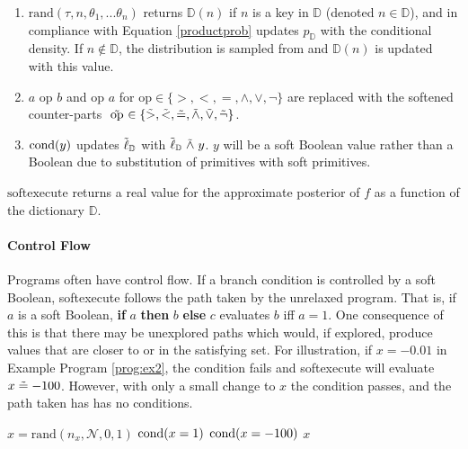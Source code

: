\begin{enumerate}
  \item $\textrm{rand}(\tau, n, \theta_1, ...\theta_n)$ returns $\mathbb{D}(n)$ if $n$ is a key in $\mathbb{D}$ (denoted $n \in \mathbb{D}$), and in compliance with Equation \ref{productprob} updates $p_\mathbb{D}$ with the conditional density. If $n \notin \mathbb{D}$, the distribution is sampled from and $\mathbb{D}(n)$ is updated with this value.  
  \item $a \text{ op } b$ and $\textrm{op } a$ for $\textrm{op} \in \{>, <, =, \land, \lor, \neg\}$ are replaced with the softened counter-parts $\mathrel{\tilde{\textrm{ op }}} \in \{\mathrel{\tilde{>}}, \mathrel{\tilde{<}}, \mathrel{\tilde{=}}, \mathrel{\tilde{\land}}, \mathrel{\tilde{\lor}}, \mathrel{\tilde{\neg}}\}$.
  \item $\operatorname{cond}(y)$ updates $\tilde{\operatorname{\ell}}_\mathbb{D}$ with $\tilde{\operatorname{\ell}}_\mathbb{D} \mathrel{\tilde{\land}} y$. $y$ will be a soft Boolean value rather than a Boolean due to substitution of primitives with soft primitives.
\end{enumerate}

$\textrm{softexecute}$ returns a real value for the approximate posterior of $f$ as a function of the dictionary $\mathbb{D}$.

\paragraph{Control Flow}
Programs often have control flow.
If a branch condition is controlled by a soft Boolean, softexecute follows the path taken by the unrelaxed program.  That is, if $a$ is a soft Boolean, \textbf{if} $a$ \textbf{then} $b$ \textbf{else} $c$ evaluates $b$ iff $a = 1$.
One consequence of this is that there may be unexplored paths which would, if explored, produce values that are closer to or in the satisfying set.
For illustration, if $x = -0.01$ in Example Program \ref{prog:ex2},
 the condition fails and \textrm{softexecute} will evaluate $x \mathrel{\tilde{=}} -100$. However, with only a small change to $x$ the condition passes, and the path taken has has no conditions.



\begin{exprogram}[tb]
\caption{}
\label{prog:ex2}
\begin{algorithmic}
\STATE $x = \textrm{rand}(n_x, \mathcal{N}, 0, 1)$
\STATE $\operatorname{cond}(x = 1)$
\ELSE
\STATE $\operatorname{cond}(x = -100)$
\ENDIF
{} $x$
\end{algorithmic}
\end{exprogram}



